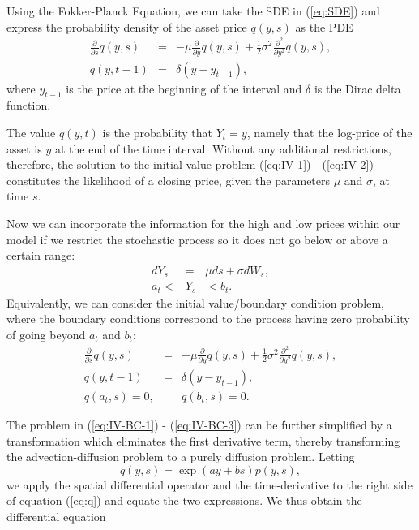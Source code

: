 Using the Fokker-Planck Equation, we can take the SDE in (\ref{eq:SDE}) and express the probability density of the asset price $q(y,s)$ as the PDE
\begin{eqnarray}
	\frac{\partial}{\partial s} q(y,s) &=& -\mu \frac{\partial}{\partial y}q(y,s) + \frac{1}{2}\sigma^2 \frac{\partial^2}{\partial y^2} q(y,s),  \label{eq:IV-1} \\
	q(y,t-1) &=& \delta(y-y_{t-1}), \label{eq:IV-2}
\end{eqnarray}
where $y_{t-1}$ is the price at the beginning of the interval and $\delta$ is the Dirac delta function.

The value $q(y,t)$ is the probability that $Y_t = y$, namely that the log-price of the asset is $y$ at the end of the time interval. Without any additional restrictions, therefore, the solution to the initial value problem (\ref{eq:IV-1}) - (\ref{eq:IV-2}) constitutes the likelihood of a closing price, given the parameters $\mu$ and $\sigma$, at time $s$.

Now we can incorporate the information for the high and low prices within our model if we restrict the stochastic process so it does not go below or above a certain range:
\begin{eqnarray}
	dY_s &=& \mu ds + \sigma dW_s, \label{eq:SDE-bc-1} \\
	a_t < &Y_s& < b_t. \label{eq:SDE-bc-2}
\end{eqnarray}
Equivalently, we can consider the initial value/boundary condition problem, where the boundary conditions correspond to the process having zero probability of going beyond $a_t$ and $b_t$:
\begin{eqnarray}
	\frac{\partial}{\partial s} q(y,s) &=& -\mu \frac{\partial}{\partial y}q(y,s) + \frac{1}{2}\sigma^2 \frac{\partial^2}{\partial y^2} q(y,s),  \label{eq:IV-BC-1} \\
	q(y,t-1) &=& \delta(y-y_{t-1}), \label{eq:IV-BC-2} \\
	q(a_t,s) = 0, && q(b_t, s) = 0. \label{eq:IV-BC-3} 
\end{eqnarray}

The problem in (\ref{eq:IV-BC-1}) - (\ref{eq:IV-BC-3}) can be further simplified by a transformation which eliminates the first derivative term, thereby transforming the advection-diffusion problem to a purely diffusion problem. Letting 
\begin{equation}
	q(y,s) = \exp(ay + bs)p(y,s), \label{eq:q}
\end{equation}
we apply the spatial differential operator and the time-derivative to the right side of equation (\ref{eq:q}) and equate the two expressions. We thus obtain the differential equation

